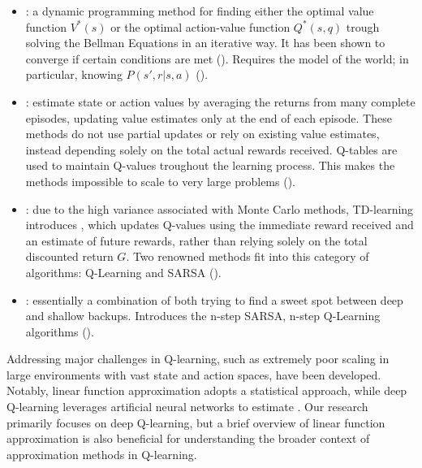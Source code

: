         \vspace{-2pt}
        
        \begin{itemize}[itemsep=4pt, parsep=0pt]
            \item {}: a dynamic programming method for finding either the optimal value function $V^{*}(s)$ or the optimal action-value function $Q^{*}(s, q)$ trough solving the Bellman Equations in an iterative way. It has been shown to converge if certain conditions are met  (\cite{dellavecchia}). Requires the model of the world; in particular, knowing $P(s', r | s, a)$ (\cite{Sutton1998}).
        
            \item {}: estimate state or action values by averaging the returns from many complete episodes, updating value estimates only at the end of each episode. These methods do not use partial updates or rely on existing value estimates, instead depending solely on the total actual rewards received. Q-tables are used to maintain Q-values troughout the learning process. This makes the methods impossible to scale to very large problems (\cite{Sutton1998}).
        
            \item {}: due to the high variance associated with Monte Carlo methods, TD-learning introduces , which updates Q-values using the immediate reward received and an estimate of future rewards, rather than relying solely on the total discounted return $G$. Two renowned methods fit into this category of algorithms: Q-Learning and SARSA (\cite{Sutton1998}).
        
            \item {}: essentially a combination of both trying to find a sweet spot between deep and shallow backups. Introduces the n-step SARSA, n-step Q-Learning algorithms (\cite{Sutton1998}).
        
        \end{itemize}
        
        \noindent Addressing major challenges in Q-learning, such as extremely poor scaling in large environments with vast state and action spaces,  have been developed. Notably, linear function approximation adopts a statistical approach, while deep Q-learning leverages artificial neural networks to estimate . Our research primarily focuses on deep Q-learning, but a brief overview of linear function approximation is also beneficial for understanding the broader context of approximation methods in Q-learning. 
        
